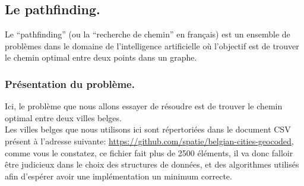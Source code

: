 \documentclass[a4paper, 12pt]{article}
\numberwithin{equation}{subsection}
\begin{document}
\subsection{Le pathfinding.}
Le ``pathfinding'' (ou la ``recherche de chemin'' en français) est un ensemble de problèmes dans le domaine de l'intelligence artificielle où l'objectif est de trouver le chemin optimal entre deux points dans un graphe. \\
\subsubsection{Présentation du problème.}
Ici, le problème que nous allons essayer de résoudre est de trouver le chemin optimal entre deux villes belges. \\
Les villes belges que nous utilisons ici sont répertoriées dans le document CSV présent à l'adresse suivante: \url{https://github.com/spatie/belgian-cities-geocoded},
comme vous le constatez, ce fichier fait plus de 2500 éléments, il va donc falloir être judicieux dans le choix des structures de données, et des algorithmes utilisés afin d'espérer avoir une implémentation un minimum correcte. \\[0.2cm]
\end{document}
